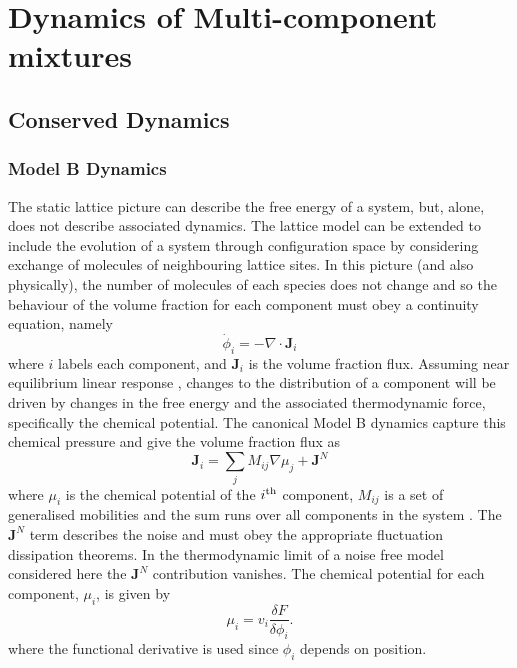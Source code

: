 \section{Dynamics of Multi-component mixtures}

\subsection{Conserved Dynamics}

\subsubsection{Model B Dynamics}
The static lattice picture can describe the free energy of a system, but, alone, does not describe associated dynamics. The lattice model can be extended to include the evolution of a system through configuration space by considering exchange of molecules of neighbouring lattice sites. In this picture (and also physically), the number of molecules of each species does not change and so the behaviour of the volume fraction for each component must obey a continuity equation, namely\cite{li_non-equilibrium_2020}
\begin{equation}
    \dot{\phi}_i = - \nabla \cdot \textbf{J}_i
    \label{eq:2-continuityModB}
\end{equation}
where $i$ labels each component, and $\textbf{J}_i$ is the volume fraction flux. Assuming near equilibrium linear response \cite{groot_non-equilibrium_1984}, changes to the distribution of a component will be driven by changes in the free energy and the associated thermodynamic force, specifically the chemical potential. The canonical Model B dynamics capture this chemical pressure and give the volume fraction flux as
\begin{equation}
    \textbf{J}_i = \sum_j M_{ij}\nabla\mu_j + \textbf{J}^N
    \label{eq:2-fluxModB}
\end{equation}
where $\mu_i$ is the chemical potential of the $i\textsuperscript{th}$ component, $M_{ij}$ is a set of generalised mobilities and the sum runs over all components in the system \cite{hohenberg_theory_1977, li_non-equilibrium_2020}. The $\textbf{J}^N$ term describes the noise and must obey the appropriate fluctuation dissipation theorems. In the thermodynamic limit of a noise free model considered here the $ \textbf{J}^N$ contribution vanishes. The chemical potential for each component, $\mu_i$, is given by
\begin{equation}
    \mu_i = v_i\frac{\delta F}{\delta \phi_i}.
\end{equation}
where the functional derivative is used since $\phi_i$ depends on position.


